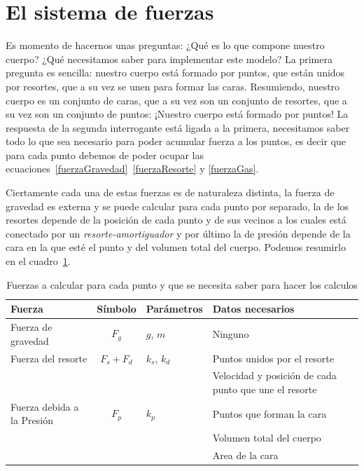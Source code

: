 \section{El sistema de fuerzas}
Es momento de hacernos unas preguntas: ¿Qué es lo que compone nuestro cuerpo? ¿Qué necesitamos saber para implementar este modelo? La primera pregunta es sencilla: nuestro cuerpo está formado por puntos, que están unidos por resortes, que a su vez se unen para formar las caras. Resumiendo, nuestro cuerpo es un conjunto de caras, que a su vez son un conjunto de resortes, que a su vez son un conjunto de puntos: ¡Nuestro cuerpo está formado por puntos! La respuesta de la segunda interrogante está ligada a la primera, necesitamos saber todo lo que sea necesario para poder acumular fuerza a los puntos, es decir que para cada punto debemos de poder ocupar las ecuaciones~\ref{fuerzaGravedad}~\ref{fuerzaResorte} y \ref{fuerzaGas}.

Ciertamente cada una de estas fuerzas es de naturaleza distinta, la fuerza de gravedad es externa y se puede calcular para cada punto por separado, la de los resortes depende de la posición de cada punto y de sus vecinos a los cuales está conectado por un \emph{resorte-amortiguador} y por último la de presión depende de la cara en la que esté el punto y del volumen total del cuerpo. Podemos resumirlo en el cuadro~\ref{ejemplo:fuerzas}.

\begin{table}
\caption[Resumen de las fuerzas que actúan sobre cada partícula]{Fuerzas a calcular para cada punto y que se necesita saber para hacer los calculos}
\label{ejemplo:fuerzas}
\begin{center}
\begin{tabular} {|p{2cm}|c|p{2cm}|p{7cm}|} \hline
Fuerza & Símbolo &  Parámetros & Datos necesarios \\ \hline
Fuerza de gravedad & $ F_g $ & $g$, $m$ & Ninguno \\ \hline
Fuerza del resorte & $ F_s + F_d $ & $k_s$, $k_d$ & Puntos unidos por el resorte \\
& & & Velocidad y posición de cada punto que une el resorte \\ \hline
Fuerza debida a la Presión & $ F_p $ & $k_p$ & Puntos que forman la cara \\ 
& & & Volumen total del cuerpo \\ 
& & & Area de la cara \\ \hline
\end{tabular}
\end{center}
\end{table}

